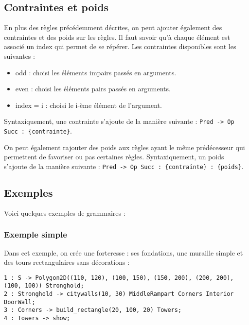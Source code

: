 \documentclass[a4paper,11pt]{article}
\begin{document}
\subsection{Contraintes et poids}
En plus des règles précédemment décrites, on peut ajouter également des contraintes et des poids sur les règles.
Il faut savoir qu'à chaque élément est associé un index qui permet de se répérer.
Les contraintes disponibles sont les suivantes :
\begin{itemize}
	\item odd : choisi les éléments impairs passés en arguments.
	\item even : choisi les éléments pairs passés en arguments.
    \item index = i : choisi le i-ème élément de l'argument.
\end{itemize}
Syntaxiquement, une contrainte s'ajoute de la manière suivante : \texttt{Pred -> Op Succ : \{contrainte\}}.

On peut également rajouter des poids aux règles ayant le même prédécesseur qui permettent de favoriser ou pas certaines règles.
Syntaxiquement, un poids s'ajoute de la manière suivante : \texttt{Pred -> Op Succ : \{contrainte\} : \{poids\}}.

\subsection{Exemples}

Voici quelques exemples de grammaires :

\subsubsection{Exemple simple}
Dans cet exemple, on crée une forteresse : ses fondations, une muraille simple et des tours rectangulaires sans décorations :
\begin{verbatim}
1 : S -> Polygon2D((110, 120), (100, 150), (150, 200), (200, 200), (100, 100)) Stronghold;
2 : Stronghold -> citywalls(10, 30) MiddleRampart Corners Interior DoorWall;
3 : Corners -> build_rectangle(20, 100, 20) Towers;
4 : Towers -> show;
\end{verbatim}
\end{document}
